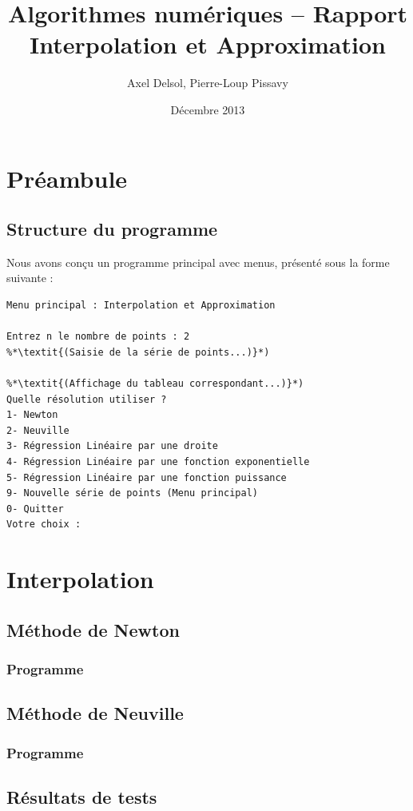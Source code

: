 \documentclass{report}
\title{Algorithmes numériques -- Rapport \\ \vspace{0.5cm}Interpolation et Approximation}
\author{Axel Delsol, Pierre-Loup Pissavy}
\date{Décembre 2013}
\begin{document}
  \maketitle
  \tableofcontents

  \chapter{Préambule}
    \section{Structure du programme}
    Nous avons conçu un programme principal avec menus, présenté sous la forme suivante :
    \begin{lstlisting}[style=apercu, name=Menu Principal]
Menu principal : Interpolation et Approximation

Entrez n le nombre de points : 2
%*\textit{(Saisie de la série de points...)}*)

%*\textit{(Affichage du tableau correspondant...)}*)
Quelle résolution utiliser ?
1- Newton
2- Neuville
3- Régression Linéaire par une droite
4- Régression Linéaire par une fonction exponentielle
5- Régression Linéaire par une fonction puissance
9- Nouvelle série de points (Menu principal)
0- Quitter
Votre choix :
    \end{lstlisting}
  \chapter{Interpolation}
    \section{Méthode de Newton}
      \subsection{Programme}
	
	\renewcommand{\arraystretch}{2}
	\renewcommand{\arraystretch}{1}
    \newpage
    \section{Méthode de Neuville}
      \subsection{Programme}
	
    \newpage
    \section{Résultats de tests}
      
\end{document}
